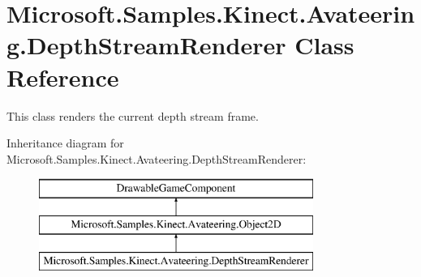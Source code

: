 \hypertarget{class_microsoft_1_1_samples_1_1_kinect_1_1_avateering_1_1_depth_stream_renderer}{\section{Microsoft.\+Samples.\+Kinect.\+Avateering.\+Depth\+Stream\+Renderer Class Reference}
\label{class_microsoft_1_1_samples_1_1_kinect_1_1_avateering_1_1_depth_stream_renderer}
}


This class renders the current depth stream frame.  


Inheritance diagram for Microsoft.\+Samples.\+Kinect.\+Avateering.\+Depth\+Stream\+Renderer\+:\begin{figure}[H]
\begin{center}
\leavevmode
\includegraphics[height=3.000000cm]{class_microsoft_1_1_samples_1_1_kinect_1_1_avateering_1_1_depth_stream_renderer}
\end{center}
\end{figure}
